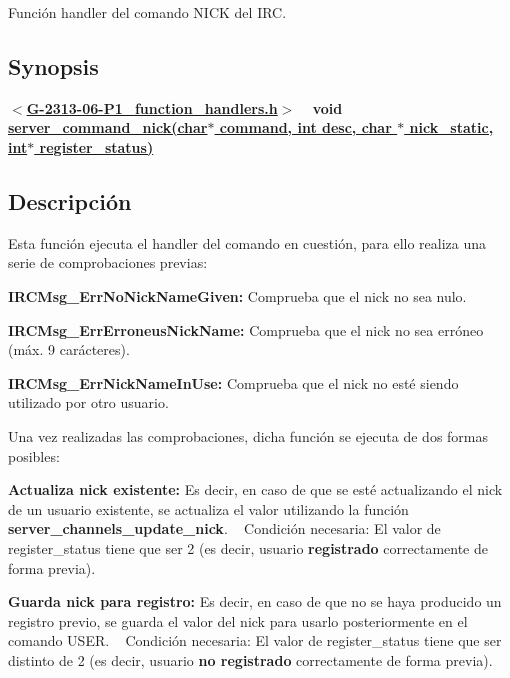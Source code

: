 Función handler del comando N\+I\+CK del I\+RC.\hypertarget{server_command_nick_synopsis_nick}{}\subsection{Synopsis}\label{server_command_nick_synopsis_nick}
{ {\bfseries $<$\hyperlink{G-2313-06-P1__function__handlers_8h}{G-\/2313-\/06-\/\+P1\+\_\+function\+\_\+handlers.\+h}$>$} ~\newline
 {\bfseries void \hyperlink{G-2313-06-P1__function__handlers_8c_aeefab469ba48ce1655dd5afd14f104b4}{server\+\_\+command\+\_\+nick(char$\ast$ command, int desc, char $\ast$ nick\+\_\+static, int$\ast$ register\+\_\+status)}} } \hypertarget{server_command_nick_descripcion_nick}{}\subsection{Descripción}\label{server_command_nick_descripcion_nick}
Esta función ejecuta el handler del comando en cuestión, para ello realiza una serie de comprobaciones previas\+:


\begin{DoxyItemize}
\item {\bfseries I\+R\+C\+Msg\+\_\+\+Err\+No\+Nick\+Name\+Given\+:} Comprueba que el nick no sea nulo. 
\item {\bfseries I\+R\+C\+Msg\+\_\+\+Err\+Erroneus\+Nick\+Name\+:} Comprueba que el nick no sea erróneo (máx. 9 carácteres). 
\item {\bfseries I\+R\+C\+Msg\+\_\+\+Err\+Nick\+Name\+In\+Use\+:} Comprueba que el nick no esté siendo utilizado por otro usuario. 
\end{DoxyItemize}

Una vez realizadas las comprobaciones, dicha función se ejecuta de dos formas posibles\+:


\begin{DoxyItemize}
\item {\bfseries Actualiza nick existente\+:} Es decir, en caso de que se esté actualizando el nick de un usuario existente, se actualiza el valor utilizando la función {\bfseries server\+\_\+channels\+\_\+update\+\_\+nick}. ~\newline
Condición necesaria\+: El valor de register\+\_\+status tiene que ser 2 (es decir, usuario {\bfseries registrado} correctamente de forma previa).  
\item {\bfseries Guarda nick para registro\+:} Es decir, en caso de que no se haya producido un registro previo, se guarda el valor del nick para usarlo posteriormente en el comando U\+S\+ER. ~\newline
Condición necesaria\+: El valor de register\+\_\+status tiene que ser distinto de 2 (es decir, usuario {\bfseries no registrado} correctamente de forma previa).  
\end{DoxyItemize}

